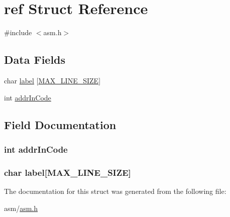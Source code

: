 \hypertarget{structref}{}\section{ref Struct Reference}
\label{structref}


{\ttfamily \#include $<$asm.\+h$>$}

\subsection*{Data Fields}
\begin{DoxyCompactItemize}
\item 
char \hyperlink{structref_aedfa2cebe85a7a3bce74cef7c10f9582}{label} \mbox{[}\hyperlink{asm_8h_a706068f562dd5c64a8b7bbd4b2298dd1}{M\+A\+X\+\_\+\+L\+I\+N\+E\+\_\+\+S\+I\+ZE}\mbox{]}
\item 
int \hyperlink{structref_acc8fb096da23df318c3645246eba7129}{addr\+In\+Code}
\end{DoxyCompactItemize}


\subsection{Field Documentation}
\subsubsection[{\texorpdfstring{addr\+In\+Code}{addrInCode}}]{\setlength{\rightskip}{0pt plus 5cm}int addr\+In\+Code}\hypertarget{structref_acc8fb096da23df318c3645246eba7129}{}\label{structref_acc8fb096da23df318c3645246eba7129}
\subsubsection[{\texorpdfstring{label}{label}}]{\setlength{\rightskip}{0pt plus 5cm}char {\bf label}\mbox{[}{\bf M\+A\+X\+\_\+\+L\+I\+N\+E\+\_\+\+S\+I\+ZE}\mbox{]}}\hypertarget{structref_aedfa2cebe85a7a3bce74cef7c10f9582}{}\label{structref_aedfa2cebe85a7a3bce74cef7c10f9582}


The documentation for this struct was generated from the following file\+:\begin{DoxyCompactItemize}
\item 
asm/\hyperlink{asm_8h}{asm.\+h}\end{DoxyCompactItemize}
